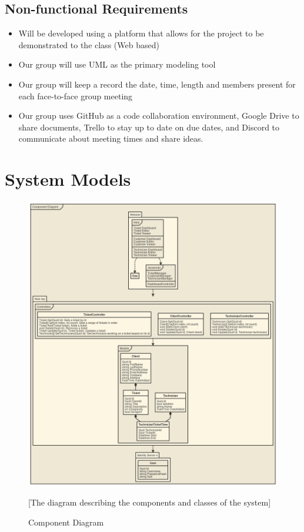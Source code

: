 \documentclass[letterpaper]{article}
\begin{document}
\subsection{Non-functional Requirements}
\begin{itemize}
  \item  Will be developed using a platform that allows for the project to be demonstrated to the class (Web based)
  \item Our group will use UML as the primary modeling tool
  \item Our group will keep a record the date, time, length and members present for each face-to-face group meeting
  \item Our group uses GitHub as a code collaboration environment, Google Drive to share documents, Trello to stay up to date on due dates, and Discord to communicate about meeting times and share ideas. 
\end{itemize}

\pagebreak

\section{System Models}
\begin{figure}[htbp]
  \includegraphics[scale =.5, width = \textwidth, height = \textheight]{ComponentDiagram}
  \caption{Component Diagram}[The diagram describing the components and classes of the system]
  \centering
\end{figure}
\end{document}
